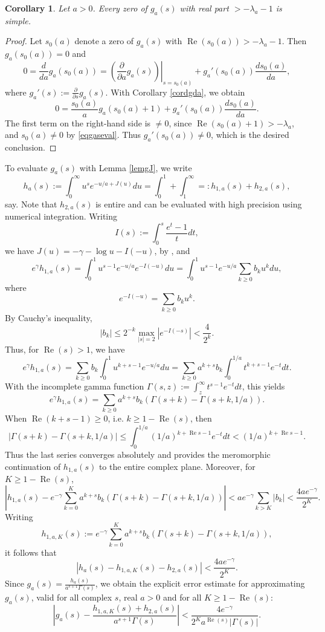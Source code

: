 \documentclass[11pt]{amsart}
\newtheorem{corollary}{Corollary}
\DeclareMathOperator{\re}{Re}
\begin{document}
\begin{corollary}\label{corsimplepoles}
Let $a>0$. Every zero of $g_a(s)$ with real part $>-\lambda_a - 1$ is simple. 
\end{corollary}
\begin{proof}
Let $s_0(a)$ denote a zero of $g_a(s)$ with $\re(s_0(a))>-\lambda_a - 1$. Then $g_a(s_0(a))=0$ and 
$$
0=\frac{d}{da} g_a(s_0(a)) = \left.\left( \frac{\partial }{\partial a} g_a(s) \right) \right|_{s=s_0(a)} + g_a'(s_0(a)) \frac{d s_0(a)}{da},
$$
where $g_a'(s):=\frac{\partial}{\partial s}g_a(s)$. With Corollary \ref{cordgda}, we obtain
$$
0= \frac{s_0(a)}{a} g_a(s_0(a)+1) + g_a'(s_0(a)) \frac{d s_0(a)}{da}.
$$
The first term on the right-hand side is $\neq 0$, since $\re(s_0(a)+1)>-\lambda_a$, and $s_0(a)\neq 0$ by \eqref{eqgaseval}.
Thus $ g_a'(s_0(a))\neq 0$, which is the desired conclusion.
\end{proof}

To evaluate $g_a(s)$ with Lemma \ref{lemgJ}, we write
$$
 h_a(s):=\int_0^\infty u^s e^{-u/a+J(u)} du =\int_0^1  +\int_1^\infty =: h_{1,a}(s)+h_{2,a}(s),
$$
say. Note that $h_{2,a}(s)$ is entire and can be evaluated with high precision using numerical integration.
Writing 
$$
I(s):= \int_0^s \frac{e^t-1}{t} dt,
$$
we have $J(u)=-\gamma -\log u - I(-u)$, by \cite[Lemma III.5.9]{Ten}, and
$$
e^\gamma h_{1,a}(s) =  \int_0^1 u^{s-1 }e^{-u/a} e^{-I(-u)} du =  \int_0^1 u^{s-1 }e^{-u/a} \sum_{k\ge 0} b_k u^k  du,
$$
where 
$$
e^{-I(-u)}= \sum_{k\ge 0} b_k u^k .
$$
By Cauchy's inequality,
$$
|b_k| \le  2^{-k}\max_{|s|=2} | e^{-I(-s)}| < \frac{4}{2^k}.
$$
Thus, for $\re(s)>1$, we have
$$
e^\gamma h_{1,a}(s) = \sum_{k\ge 0} b_k  \int_0^1 u^{k+s-1 }e^{-u/a}  du = \sum_{k\ge 0} a^{k+s} b_k  \int_0^{1/a} t^{k+s-1 }e^{-t}  dt.
$$
With the incomplete gamma function $\Gamma(s,z):=\int_z^\infty t^{s-1} e^{-t} dt$, this yields
$$
e^\gamma h_{1,a}(s) =\sum_{k\ge 0} a^{k+s} b_k (\Gamma(s+k)-\Gamma(s+k,1/a)).
$$
When $\re(k+s-1)\ge 0$, i.e. $k\ge 1-\re(s)$, then 
$$
|\Gamma(s+k)-\Gamma(s+k,1/a)| \le \int_0^{1/a} (1/a)^{k+\re{s}-1} e^{-t} dt <  (1/a)^{k+\re{s}-1}.
$$
Thus the last series converges absolutely and provides the meromorphic continuation of $h_{1,a}(s)$ to the entire complex plane. 
Moreover, for $K\ge 1-\re(s)$,
$$
\left| h_{1,a}(s) -e^{-\gamma}\sum_{k= 0}^K a^{k+s} b_k (\Gamma(s+k)-\Gamma(s+k,1/a))\right| 
<  a e^{-\gamma}\sum_{k>K} |b_k| < \frac{4a e^{-\gamma}}{2^K}.
$$
Writing 
$$
h_{1,a,K}(s):=e^{-\gamma}\sum_{k= 0}^K a^{k+s} b_k (\Gamma(s+k)-\Gamma(s+k,1/a)),
$$
it follows that 
$$
|h_a(s) - h_{1,a,K}(s) - h_{2,a}(s)| <  \frac{4a e^{-\gamma}}{2^K}.
$$
Since $g_a(s) = \frac{h_a(s)}{a^{s+1} \Gamma(s)}$, we obtain the explicit error estimate for approximating $g_a(s)$, valid for all complex $s$, 
real $a>0$ and for all $K\ge 1-\re(s)$:
\begin{equation}\label{gasapprox}
\left|g_a(s) - \frac{h_{1,a,K}(s) + h_{2,a}(s)}{a^{s+1} \Gamma(s)} \right| <   \frac{4 e^{-\gamma}}{2^K a^{\re(s)} |\Gamma(s)|}.
\end{equation}
\end{document}
